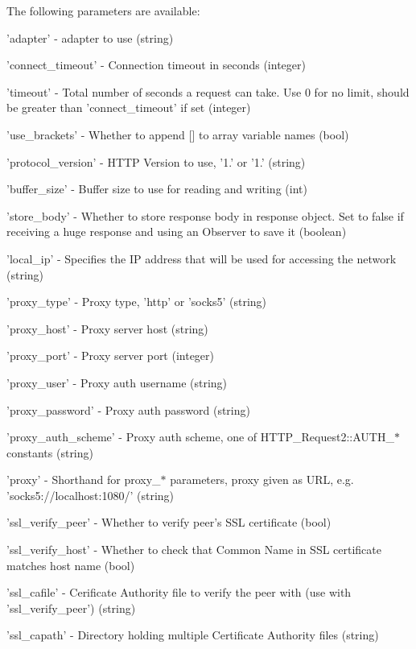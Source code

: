 The following parameters are available\-: 
\begin{DoxyItemize}
\item 'adapter' -\/ adapter to use (string) 
\item 'connect\-\_\-timeout' -\/ Connection timeout in seconds (integer) 
\item 'timeout' -\/ Total number of seconds a request can take. Use 0 for no limit, should be greater than 'connect\-\_\-timeout' if set (integer) 
\item 'use\-\_\-brackets' -\/ Whether to append \mbox{[}\mbox{]} to array variable names (bool) 
\item 'protocol\-\_\-version' -\/ H\-T\-T\-P Version to use, '1.' or '1.' (string) 
\item 'buffer\-\_\-size' -\/ Buffer size to use for reading and writing (int) 
\item 'store\-\_\-body' -\/ Whether to store response body in response object. Set to false if receiving a huge response and using an Observer to save it (boolean) 
\item 'local\-\_\-ip' -\/ Specifies the I\-P address that will be used for accessing the network (string) 
\item 'proxy\-\_\-type' -\/ Proxy type, 'http' or 'socks5' (string) 
\item 'proxy\-\_\-host' -\/ Proxy server host (string) 
\item 'proxy\-\_\-port' -\/ Proxy server port (integer) 
\item 'proxy\-\_\-user' -\/ Proxy auth username (string) 
\item 'proxy\-\_\-password' -\/ Proxy auth password (string) 
\item 'proxy\-\_\-auth\-\_\-scheme' -\/ Proxy auth scheme, one of H\-T\-T\-P\-\_\-\-Request2\-::\-A\-U\-T\-H\-\_\-$\ast$ constants (string) 
\item 'proxy' -\/ Shorthand for proxy\-\_\-$\ast$ parameters, proxy given as U\-R\-L, e.\-g. 'socks5\-://localhost\-:1080/' (string) 
\item 'ssl\-\_\-verify\-\_\-peer' -\/ Whether to verify peer's S\-S\-L certificate (bool) 
\item 'ssl\-\_\-verify\-\_\-host' -\/ Whether to check that Common Name in S\-S\-L certificate matches host name (bool) 
\item 'ssl\-\_\-cafile' -\/ Cerificate Authority file to verify the peer with (use with 'ssl\-\_\-verify\-\_\-peer') (string) 
\item 'ssl\-\_\-capath' -\/ Directory holding multiple Certificate Authority files (string) 

\end{DoxyItemize}
